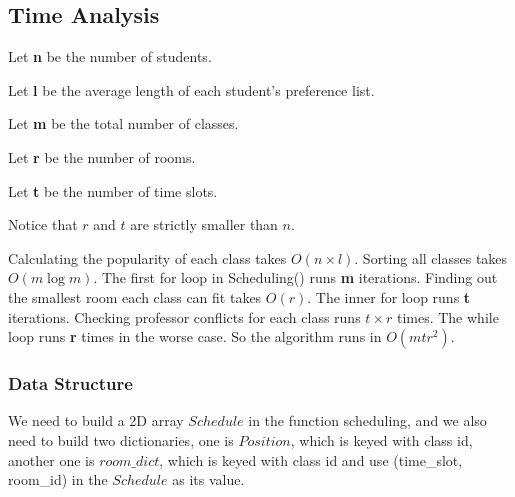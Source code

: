 \documentclass[11pt, oneside]{article}   	%
\begin{document}
\begin{algorithm}[H]
\end{algorithm}


\subsection{Time Analysis}
Let \textbf{n} be the number of students. 

Let \textbf{l} be the average length of each student's preference list.

Let \textbf{m} be the total number of classes. 

Let \textbf{r} be the number of rooms. 

Let \textbf{t} be the number of time slots. 

Notice that $r$ and $t$ are strictly smaller than $n$.

Calculating the popularity of each class takes $O(n \times l)$. Sorting all classes takes $O(m\log m)$. The first for loop in Scheduling() runs \textbf{m} iterations. Finding out the smallest room each class can fit takes $O(r)$. The inner for loop runs \textbf{t} iterations. Checking professor conflicts for each class runs $t \times r$ times. The while loop runs \textbf{r} times in the worse case. So the algorithm runs in $O(mtr^2)$.

\subsubsection{Data Structure}
We need to build a 2D array $Schedule$ in the function scheduling, and we also need to build two dictionaries, one is $Position$, which is keyed with class id, another one is $room\_dict$, which is keyed with class id and use (time\_slot, room\_id) in the $Schedule$ as its value. 
\end{document}
